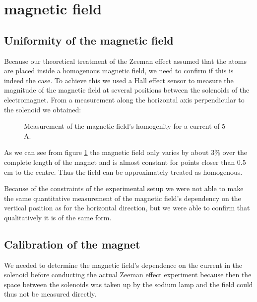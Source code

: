 \section{magnetic field}
\subsection{Uniformity of the magnetic field}
Because our theoretical treatment of the Zeeman effect assumed that the atoms are placed inside a homogenous magnetic field, we need to confirm if this is indeed the case.
To achieve this we used a Hall effect sensor to measure the magnitude of the magnetic field at several positions between the solenoids of the electromagnet. From a measurement along the horizontal axis perpendicular to the solenoid we obtained:
\begin{figure}[H]
\centering
	 \hspace*{-.5cm}
	 \caption{Measurement of the magnetic field's homogenity  for a current of 5 A. }
	 \label{fig:homogenitaet}
\end{figure}
As we can see from figure \ref{fig:homogenitaet} the magnetic field only varies by about 3\% over the complete length of the magnet and is almost constant for points closer than 0.5 cm to the centre. Thus the field can be approximately treated as homogenous.

Because of the constraints of the experimental setup we were not able to make the same quantitative measurement of the magnetic field's dependency  on the vertical position as for the horizontal direction, but we were able to confirm that qualitatively it is of the same form.
\subsection{Calibration of the magnet}
We needed to determine the magnetic field's dependence on the current in the solenoid before conducting the actual Zeeman effect experiment because then the space between the solenoids was taken up by the sodium lamp and the field could thus not be measured directly.

